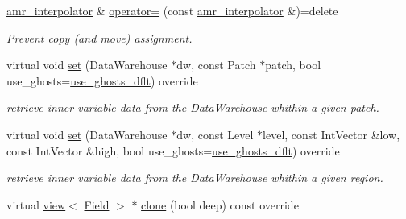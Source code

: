 \begin{DoxyCompactItemize}
\hyperlink{classUintah_1_1PhaseField_1_1detail_1_1amr__interpolator}{amr\+\_\+interpolator} \& \hyperlink{classUintah_1_1PhaseField_1_1detail_1_1amr__interpolator_3_01ScalarField_3_01T_01_4_00_01Problemd2db9de1754b5450c93c191a9275f5ed_aa081fd4fb3b2875c48d15712f3dc1a5c}{operator=} (const \hyperlink{classUintah_1_1PhaseField_1_1detail_1_1amr__interpolator}{amr\+\_\+interpolator} \&)=delete
\begin{DoxyCompactList}\small\item\em Prevent copy (and move) assignment. \end{DoxyCompactList}\item 
virtual void \hyperlink{classUintah_1_1PhaseField_1_1detail_1_1amr__interpolator_3_01ScalarField_3_01T_01_4_00_01Problemd2db9de1754b5450c93c191a9275f5ed_a2dfec8ca1eebdd59bda5dec83403d674}{set} (Data\+Warehouse $\ast$dw, const Patch $\ast$patch, bool use\+\_\+ghosts=\hyperlink{classUintah_1_1PhaseField_1_1detail_1_1amr__interpolator_3_01ScalarField_3_01T_01_4_00_01Problemd2db9de1754b5450c93c191a9275f5ed_a05a1e360547dde624240ae943f6ced4b}{use\+\_\+ghosts\+\_\+dflt}) override
\begin{DoxyCompactList}\small\item\em retrieve inner variable data from the Data\+Warehouse whithin a given patch. \end{DoxyCompactList}\item 
virtual void \hyperlink{classUintah_1_1PhaseField_1_1detail_1_1amr__interpolator_3_01ScalarField_3_01T_01_4_00_01Problemd2db9de1754b5450c93c191a9275f5ed_a014b41daf40384377d58ba9ada6a42ba}{set} (Data\+Warehouse $\ast$dw, const Level $\ast$level, const Int\+Vector \&low, const Int\+Vector \&high, bool use\+\_\+ghosts=\hyperlink{classUintah_1_1PhaseField_1_1detail_1_1amr__interpolator_3_01ScalarField_3_01T_01_4_00_01Problemd2db9de1754b5450c93c191a9275f5ed_a05a1e360547dde624240ae943f6ced4b}{use\+\_\+ghosts\+\_\+dflt}) override
\begin{DoxyCompactList}\small\item\em retrieve inner variable data from the Data\+Warehouse whithin a given region. \end{DoxyCompactList}\item 
virtual \hyperlink{classUintah_1_1PhaseField_1_1detail_1_1view}{view}$<$ \hyperlink{structUintah_1_1PhaseField_1_1ScalarField}{Field} $>$ $\ast$ \hyperlink{classUintah_1_1PhaseField_1_1detail_1_1amr__interpolator_3_01ScalarField_3_01T_01_4_00_01Problemd2db9de1754b5450c93c191a9275f5ed_a81fe3ebe5215f1879c8fcacad90a240e}{clone} (bool deep) const override

\end{DoxyCompactItemize}

